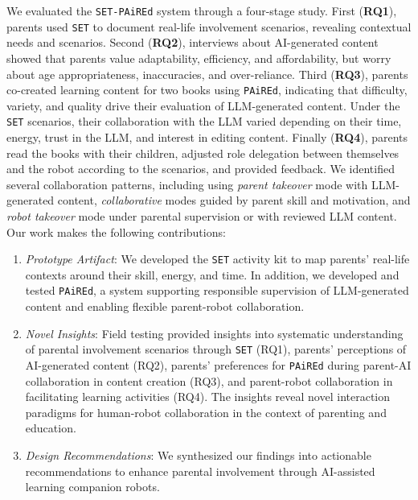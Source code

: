 We evaluated the \texttt{SET-PAiREd} system through a four-stage study. First (\textbf{RQ1}), parents used \texttt{SET} to document real-life involvement scenarios, revealing contextual needs and scenarios. Second (\textbf{RQ2}), interviews about AI-generated content showed that parents value adaptability, efficiency, and affordability, but worry about age appropriateness, inaccuracies, and over-reliance. Third (\textbf{RQ3}), parents co-created learning content for two books using \texttt{PAiREd}, indicating that difficulty, variety, and quality drive their evaluation of LLM-generated content. Under the \texttt{SET} scenarios, their collaboration with the LLM varied depending on their time, energy, trust in the LLM, and interest in editing content. Finally (\textbf{RQ4}), parents read the books with their children, adjusted role delegation between themselves and the robot according to the scenarios, and provided feedback. We identified several collaboration patterns, including using \textit{parent takeover} mode with LLM-generated content, \textit{collaborative} modes guided by parent skill and motivation, and \textit{robot takeover} mode under parental supervision or with reviewed LLM content. Our work makes the following contributions:
\begin{enumerate} 
    \item \textit{Prototype Artifact}: We developed the \texttt{SET} activity kit to map parents' real-life contexts around their skill, energy, and time. In addition, we developed and tested \texttt{PAiREd}, a system supporting responsible supervision of LLM-generated content and enabling flexible parent-robot collaboration.
    \item \textit{Novel Insights}: Field testing provided insights into systematic understanding of parental involvement scenarios through \texttt{SET} (RQ1), parents' perceptions of AI-generated content (RQ2), parents' preferences for \texttt{PAiREd} during parent-AI collaboration in content creation (RQ3), and parent-robot collaboration in facilitating learning activities (RQ4). The insights reveal novel interaction paradigms for human-robot collaboration in the context of parenting and education.
    \item \textit{Design Recommendations}: We synthesized our findings into actionable recommendations to enhance parental involvement through AI-assisted learning companion robots.
\end{enumerate}
